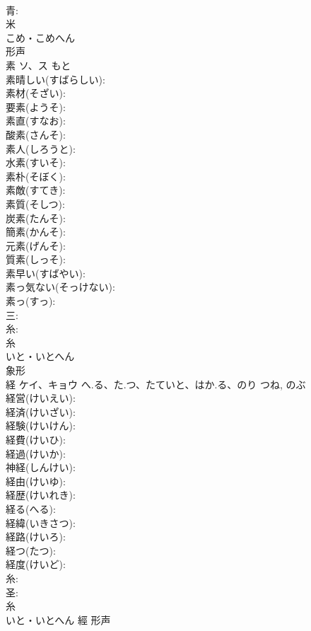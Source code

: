 \documentclass[8pt]{extreport}
\begin{document}
\begin{CJK}{UTF8}{min}
\\	青: 
\\	米	
\\	こめ・こめへん	
\\	形声 
\\	素	ソ、ス	もと		
\\	素晴しい(すばらしい): 
\\	素材(そざい): 
\\	要素(ようそ): 
\\	素直(すなお): 
\\	酸素(さんそ): 
\\	素人(しろうと): 
\\	水素(すいそ): 
\\	素朴(そぼく): 
\\	素敵(すてき): 
\\	素質(そしつ): 
\\	炭素(たんそ): 
\\	簡素(かんそ): 
\\	元素(げんそ): 
\\	質素(しっそ): 
\\	素早い(すばやい): 
\\	素っ気ない(そっけない): 
\\	素っ(すっ): 
\\	三: 
\\	糸: 
\\	糸	
\\	いと・いとへん	
\\	象形 
\\	経	ケイ、キョウ	へ.る、た.つ、たていと、はか.る、のり	つね, のぶ	
\\	経営(けいえい): 
\\	経済(けいざい): 
\\	経験(けいけん): 
\\	経費(けいひ): 
\\	経過(けいか): 
\\	神経(しんけい): 
\\	経由(けいゆ): 
\\	経歴(けいれき): 
\\	経る(へる): 
\\	経緯(いきさつ): 
\\	経路(けいろ): 
\\	経つ(たつ): 
\\	経度(けいど): 
\\	糸: 
\\	圣: 
\\	糸	
\\	いと・いとへん	經	形声 

\end{CJK}
\end{document}
